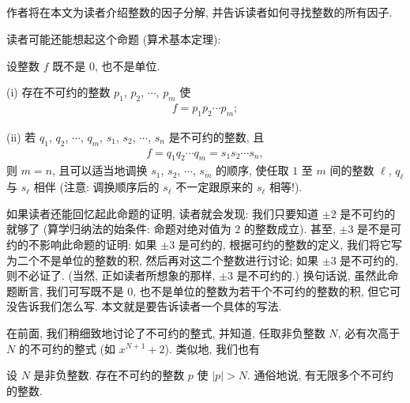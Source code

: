 \subsection*{\FactorizationOfIntegers}
\markright{\FactorizationOfIntegers}

作者将在本文为读者介绍整数的因子分解, 并告诉读者如何寻找整数的所有因子.

读者可能还能想起这个命题 (算术基本定理):
\begin{proposition}
    设整数 $f$ 既不是 $0$, 也不是单位.

    (i) 存在不可约的整数 $p_1$, $p_2$, $\cdots$, $p_m$ 使
    \begin{align*}
        f = p_1 p_2 \cdots p_m;
    \end{align*}

    (ii) 若 $q_1$, $q_2$, $\cdots$, $q_m$, $s_1$, $s_2$, $\cdots$, $s_n$ 是不可约的整数, 且
    \begin{align*}
        f = q_1 q_2 \cdots q_m = s_1 s_2 \cdots s_n,
    \end{align*}
    则 $m = n$, 且可以适当地调换 $s_1$, $s_2$, $\cdots$, $s_m$ 的顺序, 使任取 $1$ 至 $m$ 间的整数 $\ell$, $q_\ell$ 与 $s_\ell$ 相伴 (注意: 调换顺序后的 $s_\ell$ 不一定跟原来的 $s_\ell$ 相等!).
\end{proposition}

如果读者还能回忆起此命题的证明, 读者就会发现: 我们只要知道 $\pm 2$ 是不可约的就够了 (算学归纳法的始条件: 命题对绝对值为 $2$ 的整数成立). 甚至, $\pm 3$ 是不是可约的不影响此命题的证明: 如果 $\pm 3$ 是可约的, 根据可约的整数的定义, 我们将它写为二个不是单位的整数的积, 然后再对这二个整数进行讨论; 如果 $\pm 3$ 是不可约的, 则不必证了. (当然, 正如读者所想象的那样, $\pm 3$ 是不可约的.) 换句话说, 虽然此命题断言, 我们可写既不是 $0$, 也不是单位的整数为若干个不可约的整数的积, 但它可没告诉我们怎么写. 本文就是要告诉读者一个具体的写法.

在前面, 我们稍细致地讨论了不可约的整式, 并知道, 任取非负整数 $N$, 必有次高于 $N$ 的不可约的整式 (如 $x^{N+1} + 2$). 类似地, 我们也有
\begin{proposition}
    设 $N$ 是非负整数. 存在不可约的整数 $p$ 使 $|p| > N$. 通俗地说, 有无限多个不可约的整数.
\end{proposition}

